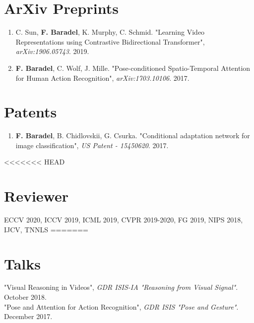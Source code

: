 \documentclass[10pt]{res} %
\begin{document}
\begin{resume}


\section{\large ArXiv Preprints} 
\begin{enumerate}[wide=0pt]
	\item C. Sun, \textbf{F. Baradel}, K. Murphy, C. Schmid. "Learning Video Representations using Contrastive Bidirectional Transformer", \textit{arXiv:1906.05743}. 2019.
	\item \textbf{F. Baradel}, C. Wolf, J. Mille. "Pose-conditioned Spatio-Temporal Attention for Human Action Recognition",  \textit{arXiv:1703.10106}. 2017.
\end{enumerate}


\section{\large Patents}
\begin{enumerate}[wide=0pt]
	\item \textbf{F. Baradel}, B. Chidlovskii, G. Csurka. "Conditional adaptation network for image classification",  \textit{US Patent - 15450620}. 2017.
\end{enumerate}

<<<<<<< HEAD
\section{\large Reviewer}  
ECCV 2020, ICCV 2019, ICML 2019, CVPR 2019-2020, FG 2019, NIPS 2018, IJCV, TNNLS
=======

\section{\large Talks}
"Visual Reasoning in Videos",  \textit{GDR ISIS-IA "Reasoning from Visual Signal"}. October 2018. \\
"Pose and Attention for Action Recognition", \textit{GDR ISIS "Pose and Gesture"}. December 2017.



\end{resume}
\end{document}

